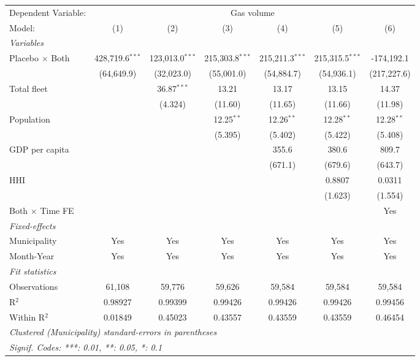 \documentclass[
]{article}
\begin{document}
\begin{tabular}{lcccccc}
\tabularnewline\midrule\midrule
Dependent Variable:&\multicolumn{6}{c}{Gas volume}\\
Model:&(1) & (2) & (3) & (4) & (5) & (6)\\
\midrule \emph{Variables}&   &   &   &   &   &  \\
Placebo $\times $ Both & 428,719.6$^{***}$ & 123,013.0$^{***}$ & 215,303.8$^{***}$ & 215,211.3$^{***}$ & 215,315.5$^{***}$ & -174,192.1\\
  &(64,649.9) & (32,023.0) & (55,001.0) & (54,884.7) & (54,936.1) & (217,227.6)\\
Total fleet &    & 36.87$^{***}$ & 13.21 & 13.17 & 13.15 & 14.37\\
  &   & (4.324) & (11.60) & (11.65) & (11.66) & (11.98)\\
Population &    &    & 12.25$^{**}$ & 12.26$^{**}$ & 12.28$^{**}$ & 12.28$^{**}$\\
  &   &    & (5.395) & (5.402) & (5.422) & (5.408)\\
GDP per capita &    &    &    & 355.6 & 380.6 & 809.7\\
  &   &    &    & (671.1) & (679.6) & (643.7)\\
HHI &    &    &    &    & 0.8807 & 0.0311\\
  &   &    &    &    & (1.623) & (1.554)\\
Both $\times$ Time FE &  &  &  &  &  & Yes\\
\midrule \emph{Fixed-effects}&   &   &   &   &   &  \\
Municipality & Yes & Yes & Yes & Yes & Yes & Yes\\
Month-Year & Yes & Yes & Yes & Yes & Yes & Yes\\
\midrule \emph{Fit statistics}&  & & & & & \\
Observations & 61,108&59,776&59,626&59,584&59,584&59,584\\
R$^2$ & 0.98927&0.99399&0.99426&0.99426&0.99426&0.99456\\
Within R$^2$ & 0.01849&0.45023&0.43557&0.43559&0.43559&0.46454\\
\midrule\midrule\multicolumn{7}{l}{\emph{Clustered (Municipality) standard-errors in parentheses}}\\
\multicolumn{7}{l}{\emph{Signif. Codes: ***: 0.01, **: 0.05, *: 0.1}}\\
\end{tabular}
\end{document}
